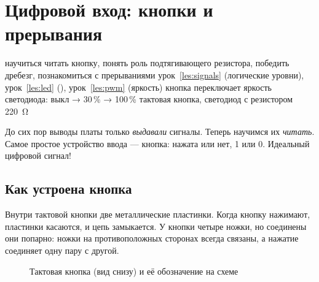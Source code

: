 \section{Цифровой вход: кнопки и прерывания}
\label{les:gpio-in}
\lessonintro
  {научиться читать кнопку, понять роль подтягивающего резистора, победить дребезг, познакомиться с прерываниями}
  {урок~\ref{les:signals} (логические уровни), урок~\ref{les:led} (), урок~\ref{les:pwm} (яркость)}
  {кнопка переключает яркость светодиода: выкл → 30\,\% → 100\,\%}
  {тактовая кнопка, светодиод с резистором \SI{220}{\ohm}}

До сих пор выводы платы только \emph{выдавали} сигналы. Теперь научимся их \emph{читать}. Самое
простое устройство ввода --- кнопка: нажата или нет, 1 или 0. Идеальный цифровой сигнал!

\subsection{Как устроена кнопка}

Внутри тактовой кнопки две металлические пластинки. Когда кнопку нажимают, пластинки касаются, и цепь
замыкается. У кнопки четыре ножки, но соединены они попарно: ножки на противоположных сторонах
всегда связаны, а нажатие соединяет одну пару с другой.

\begin{figure}[H]
\centering
{}
\caption{Тактовая кнопка (вид снизу) и её обозначение на схеме}
\end{figure}

